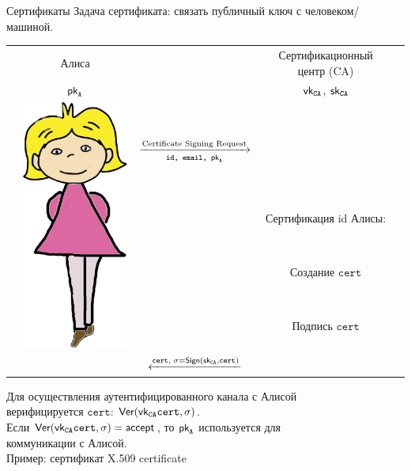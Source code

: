 \documentclass[usenames,dvipsnames,8pt,aspectratio=169]{beamer}
\begin{document}
\begin{frame}{Сертификаты}
\Large 
Задача сертификата:  связать публичный ключ с человеком/машиной.
\begin{center}
	\begin{tabular}{l c c c l}
		& \Large Алиса & &\Large Сертификационный центр (CA)&  \\ 
		&  $\textsf{pk}_{\texttt{A}}$  & & $\textsf{vk}_{\texttt{CA}}$, $\textsf{sk}_{\texttt{CA}}$ & \\
		& \multirow{5}{*}{\includegraphics[scale=0.15]{Alice}} & & &  \\  \pause
		& & $\xrightarrow[\texttt{id, email, } \textsf{pk}_{\texttt{A}}]{\text {Certificate Signing Request}}$ & & \\  \pause
		& & & \Large Сертификация id Алисы: & \\
		& & & Создание $\texttt{cert}$& \\
		& & & Подпись $\texttt{cert}$& \\
		& & $\xleftarrow{\LARGE \texttt{cert}, \; \sigma = \Sign(\sk_{\texttt{CA}}, \texttt{cert})}$ & & \\  
	\end{tabular}
\end{center}

\vspace{15pt}
\Large
Для осуществления аутентифицированного канала с Алисой \\
верифицируется $\texttt{cert}$:
$\textsf{Ver}(\textsf{vk}_{\texttt{CA}} \texttt{cert},\sigma )$. \\[5pt]

Если $\textsf{Ver}(\textsf{vk}_{\texttt{CA}} \texttt{cert},\sigma ) = \mathsf{accept}$, то $\textsf{pk}_{\texttt{A}}$ используется для \\ коммуникации с Алисой.\\[8pt]

Пример: сертификат X.509 certificate
\end{frame}
\end{document}

